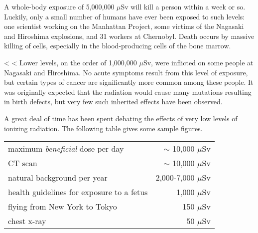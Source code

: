         A whole-body exposure of 5,000,000 $\mu$Sv 
        will kill a person
        within a week or so. Luckily, only a small number of humans
        have ever been exposed to such levels: one scientist working
        on the Manhattan  Project, some victims of the Nagasaki and
        Hiroshima explosions, and 31 workers at Chernobyl. Death
        occurs by massive killing of cells, especially in the
        blood-producing cells of the bone marrow.

<%
<%
        Lower levels, on the order of 1,000,000 $\mu$Sv, were inflicted
        on some people at Nagasaki and Hiroshima.
        No acute symptoms result from this level of exposure, but
        certain types of cancer are significantly more common among
        these people. It was originally expected that the radiation
        would cause many mutations resulting in birth defects, but
        very few such inherited effects have been observed.

        A great deal of time has been spent debating the effects of
        very low levels of ionizing radiation. The following table gives some sample figures.

\begin{tabular}{p{70mm}r}
  maximum \emph{beneficial} dose per day     & $\sim$ 10,000 $\mu$Sv  \\
  CT scan                                    & $\sim$ 10,000 $\mu$Sv  \\
  natural background per year                & 2,000-7,000 $\mu$Sv  \\
  health guidelines for exposure to a fetus  & 1,000 $\mu$Sv  \\
  flying from New York to Tokyo              & 150 $\mu$Sv  \\
  chest x-ray                                & 50 $\mu$Sv 
\end{tabular}

